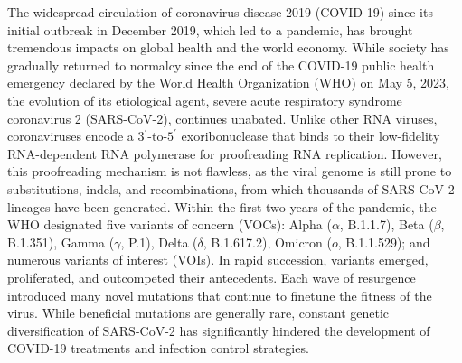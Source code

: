 \documentclass[aps,prl,amsmath,amssymb,floatfix,twocolumn, amsmath, superscriptaddress, onecolumn]{revtex4}
\begin{document}
The widespread circulation of coronavirus disease 2019 (COVID-19) since its initial outbreak in December 2019, which led to a pandemic, has brought tremendous impacts on global health and the world economy.\cite{Zhou2020, WHOinfo} While society has gradually returned to normalcy since the end of the COVID-19 public health emergency declared by the World Health Organization (WHO) on May 5, 2023,\cite{WHO_announcement} the evolution of its etiological agent, severe acute respiratory syndrome coronavirus 2 (SARS-CoV-2), continues unabated. Unlike other RNA viruses, coronaviruses encode a $3^{\prime}$-to-$5^{\prime}$ exoribonuclease that binds to their low-fidelity RNA-dependent RNA polymerase for proofreading RNA replication.\cite{Minskaia2006, Denison2011, 10.1126/science.abi9310, 10.1073/pnas.2106379119} However, this proofreading mechanism is not flawless, as the viral genome is still prone to substitutions, indels, and recombinations,\cite{McCarthy2021, 10.1126/sciadv.abb9153, 10.1038/s41579-022-00841-7, 10.1038/s41579-023-00878-2} from which thousands of SARS-CoV-2 lineages have been generated.\cite{rambaut2020dynamic} Within the first two years of the pandemic, the WHO designated five variants of concern (VOCs): Alpha ($\alpha$, B.1.1.7), Beta ($\beta$, B.1.351), Gamma ($\gamma$, P.1), Delta ($\delta$, B.1.617.2), Omicron ($o$, B.1.1.529); and numerous variants of interest (VOIs).\cite{WHOTracking} In rapid succession, variants emerged, proliferated, and outcompeted their antecedents. Each wave of resurgence introduced many novel mutations that continue to finetune the fitness of the virus.\cite{10.1038/s41579-022-00841-7} While beneficial mutations are generally rare,\cite{10.1038/217624a0, 10.1038/246096a0, 10.1093/molbev/msi242, 10.1098/rstb.2009.0282, harvey_sars-cov-2_2021} constant genetic diversification of SARS-CoV-2 has significantly hindered the development of COVID-19 treatments and infection control strategies.\cite{science371.abg4493}
\end{document}
